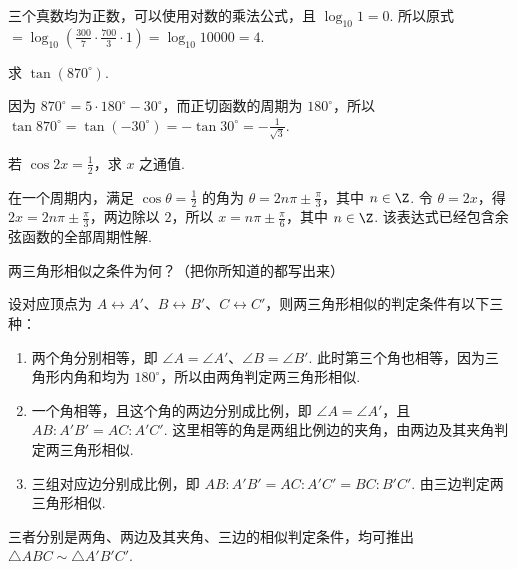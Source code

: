 \begin{solution}
三个真数均为正数，可以使用对数的乘法公式，且 \(\log_{10}1=0\). 所以原式 \(=\log_{10}\left(\frac{300}{7}\cdot\frac{700}{3}\cdot1\right)=\log_{10}10000=4\).
\end{solution}

\begin{problem}
求 \(\tan\left(870^{\circ}\right)\).
\end{problem}

\begin{solution}
因为 \(870^{\circ}=5\cdot180^{\circ}-30^{\circ}\)，而正切函数的周期为 \(180^{\circ}\)，所以 \(\tan870^{\circ}=\tan\left(-30^{\circ}\right)=-\tan30^{\circ}=-\frac{1}{\sqrt{3}}\).
\end{solution}

\begin{problem}
若 \(\cos2x=\frac{1}{2}\)，求 \(x\) 之通值.
\end{problem}

\begin{solution}
在一个周期内，满足 \(\cos\theta=\frac12\) 的角为 \(\theta=2n\pi\pm\frac\pi3\)，其中 \(n\in\Z\). 令 \(\theta=2x\)，得 \(2x=2n\pi\pm\frac\pi3\)，两边除以 \(2\)，所以 \(x=n\pi\pm\frac\pi6\)，其中 \(n\in\Z\). 该表达式已经包含余弦函数的全部周期性解.
\end{solution}

\begin{problem}
两三角形相似之条件为何？（把你所知道的都写出来）
\end{problem}

\begin{solution}
设对应顶点为 \(A\leftrightarrow A'\)、\(B\leftrightarrow B'\)、\(C\leftrightarrow C'\)，则两三角形相似的判定条件有以下三种：
\begin{enumerate}
\item 两个角分别相等，即 \(\angle A=\angle A'\)、\(\angle B=\angle B'\). 此时第三个角也相等，因为三角形内角和均为 \(180^{\circ}\)，所以由两角判定两三角形相似.
\item 一个角相等，且这个角的两边分别成比例，即 \(\angle A=\angle A'\)，且 \(AB:A'B'=AC:A'C'\). 这里相等的角是两组比例边的夹角，由两边及其夹角判定两三角形相似.
\item 三组对应边分别成比例，即 \(AB:A'B'=AC:A'C'=BC:B'C'\). 由三边判定两三角形相似.
\end{enumerate}
三者分别是两角、两边及其夹角、三边的相似判定条件，均可推出 \(\triangle ABC\sim\triangle A'B'C'\).
\end{solution}

